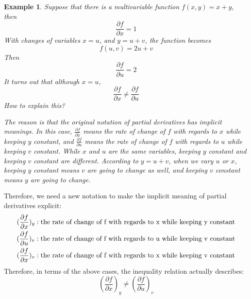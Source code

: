 \documentclass{article}
\newtheorem{example}{Example}
\begin{document}
\begin{example}
  Suppose that there is a multivariable function $f(x, y) = x + y$, then
  \begin{equation*}
    \frac{\partial f}{\partial x} = 1
  \end{equation*}
  With changes of variables $x = u$, and $y = u + v$, the function becomes
  \begin{equation*}
    f(u, v) = 2u + v
  \end{equation*}
  Then
  \begin{equation*}
    \frac{\partial f}{\partial u} = 2
  \end{equation*}
  It turns out that although $x = u$,
  \begin{equation*}
    \frac{\partial f}{\partial x} \neq \frac{\partial f}{\partial u}
  \end{equation*}
  How to explain this?

  The reason is that the original notation of partial derivatives has implicit 
  meanings. In this case, $\frac{\partial f}{\partial x}$ means the rate of 
  change of $f$ with regards to $x$ while keeping $y$ constant, and 
  $\frac{\partial f}{\partial u}$ means the rate of change of $f$ with regards 
  to $u$ while keeping $v$ constant. While $x$ and $u$ are the same variables, 
  keeping $y$ constant and keeping $v$ constant are different. According to 
  $y = u + v$, when we vary $u$ or $x$, keeping $y$ constant means $v$ are going 
  to change as well, and keeping $v$ constant means $y$ are going to change.
\end{example}

Therefore, we need a new notation to make the implicit meaning of partial 
derivatives explicit:
\begin{gather*}
  (\frac{\partial f}{\partial x})_y: \textnormal{the rate of change of f with regards to x while keeping y constant} \\
  (\frac{\partial f}{\partial u})_v: \textnormal{the rate of change of f with regards to u while keeping v constant} \\
  (\frac{\partial f}{\partial x})_v: \textnormal{the rate of change of f with regards to x while keeping v constant} \\
\end{gather*}
Therefore, in terms of the above cases, the inequality relation actually 
describes:
\begin{equation*}
  (\frac{\partial f}{\partial x})_y \neq (\frac{\partial f}{\partial u})_v
\end{equation*}
\end{document}
